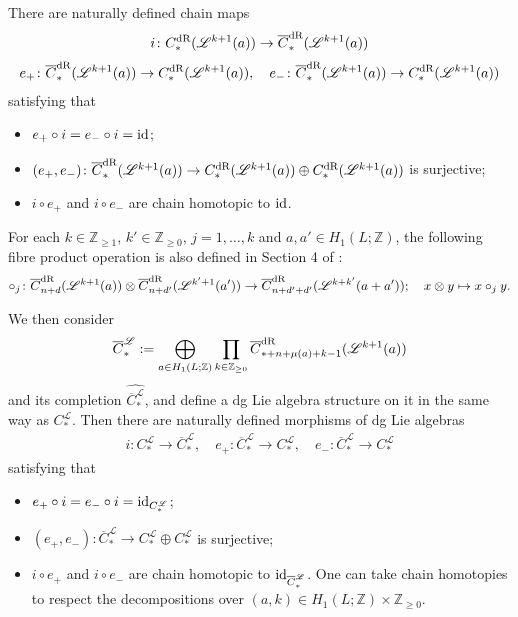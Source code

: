 \documentclass[10pt]{amsart}
\numberwithin{equation}{section}
\theoremstyle{plain}
\theoremstyle{definition}
\theoremstyle{remark}
\numberwithin{equation}{section}
\newcommand{\Z}{\mathbb{Z}}
\newcommand{\id}{\textup{id}}
\newcommand{\wh}[1]{\widehat{#1}}
\newcommand{\ol}[1]{\overline{#1}}
\newcommand{\dR}{\textup{dR}}
\newcommand{\CFr}{C_*^\mathscr{L}}
\newcommand{\CCFr}{\ol{C}_*^\mathscr{L}}
\begin{document}
{There are naturally defined chain maps
\begin{align*}
	i\colon C_*^\dR(\mathscr{L}^{k+1}(a))\to \ol{C}_*^\dR(\mathscr{L}^{k+1}(a))
\end{align*}
\begin{align*}
	e_+\colon \ol{C}_*^\dR(\mathscr{L}^{k+1}(a))\to C_*^\dR(\mathscr{L}^{k+1}(a)),\quad e_-\colon \ol{C}_*^\dR(\mathscr{L}^{k+1}(a))\to C_*^\dR(\mathscr{L}^{k+1}(a))
\end{align*}
satisfying that
\begin{itemize}
	\item $e_+\circ i = e_-\circ i = \id$;
	\item $(e_+,e_-)\colon \ol{C}_*^\dR(\mathscr{L}^{k+1}(a)) \to C_*^\dR(\mathscr{L}^{k+1}(a))\oplus C_*^\dR(\mathscr{L}^{k+1}(a))$ is surjective;
	\item $i\circ e_+$ and $i\circ e_-$ are chain homotopic to $\id$.
\end{itemize}

For each $k\in \Z_{\geq 1}$, $k'\in \Z_{\geq 0}$, $j=1,\dots, k$ and $a,a'\in H_1(L;\Z)$, the following fibre product operation is also defined in Section 4 of \cite{Irie2}:
\begin{align*}
	\circ_j\colon \ol{C}^\dR_{n+d}(\mathscr{L}^{k+1}(a))\otimes \ol{C}_{n+d'}^\dR(\mathscr{L}^{k'+1}(a')) \to \ol{C}^\dR_{n+d'+d'}(\mathscr{L}^{k+k'}(a+a'));\quad x\otimes y \mapsto x\circ_j y.
\end{align*}


We then consider 
\begin{align*}
	\CCFr:= \bigoplus_{a\in H_1(L;\Z)} \prod_{k\in \Z_{\geq 0}} \ol{C}^\dR_{*+n+\mu(a)+k-1} (\mathscr{L}^{k+1}(a))
\end{align*}
and its completion $\wh{\CCFr}$, and define a dg Lie algebra structure on it in the same way as $\CFr$.
Then there are naturally defined morphisms of dg Lie algebras
\begin{align*}
	i\colon \CFr\to \CCFr,\quad e_+\colon \CCFr\to \CFr, \quad e_-\colon \CCFr\to \CFr
\end{align*}
satisfying that 
\begin{itemize} 
	\item $e_+\circ i = e_-\circ i = \id_{\CFr}$;
	\item $(e_+,e_-)\colon \CCFr\to \CFr\oplus \CFr$ is surjective;
	\item $i\circ e_+$ and $i\circ e_-$ are chain homotopic to $\id_{\CCFr}$. One can take chain homotopies to respect the decompositions over $(a,k)\in H_1(L;\Z)\times \Z_{\geq 0}$.
\end{itemize}

}
\end{document}
